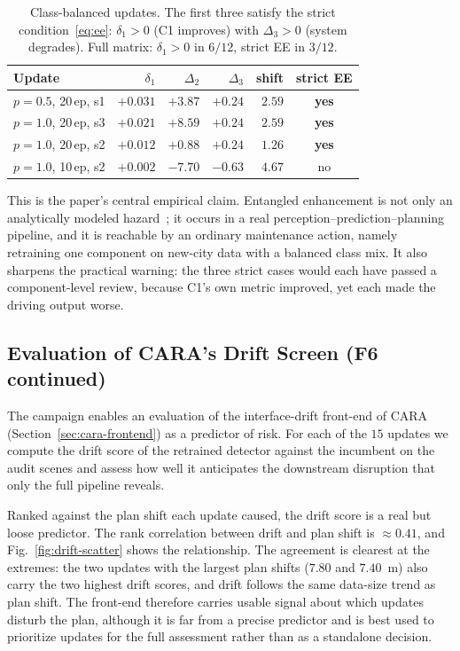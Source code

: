\documentclass[conference]{IEEEtran}
\begin{document}
\begin{table}[htbp]
\caption{Class-balanced updates. The first three satisfy the strict
condition~\eqref{eq:ee}: $\delta_1>0$ (C1 improves) with $\Delta_3>0$ (system
degrades). Full matrix: $\delta_1>0$ in $6/12$, strict EE in $3/12$.}
\label{tab:balanced}
\centering
\renewcommand{\arraystretch}{1.15}
\setlength{\tabcolsep}{4pt}
\footnotesize
\begin{tabular}{@{}lrrrrc@{}}
\toprule
\textbf{Update} & \textbf{$\delta_1$} & \textbf{$\Delta_2$} & \textbf{$\Delta_3$} & \textbf{shift} & \textbf{strict EE} \\
\midrule
$p{=}0.5$, 20\,ep, s1 & $+0.031$ & $+3.87$ & $+0.24$ & $2.59$ & \textbf{yes} \\
$p{=}1.0$, 20\,ep, s3 & $+0.021$ & $+8.59$ & $+0.24$ & $2.59$ & \textbf{yes} \\
$p{=}1.0$, 20\,ep, s2 & $+0.012$ & $+0.88$ & $+0.24$ & $1.26$ & \textbf{yes} \\
\midrule
$p{=}1.0$, 10\,ep, s2 & $+0.002$ & $-7.70$ & $-0.63$ & $4.67$ & no \\
\bottomrule
\end{tabular}
\end{table}

This is the paper's central empirical claim. Entangled enhancement is not only an
analytically modeled hazard~\cite{wang2024compsac}; it occurs in a real
perception--prediction--planning pipeline, and it is reachable by an ordinary
maintenance action, namely retraining one component on new-city data with a
balanced class mix. It also sharpens the practical warning: the three strict
cases would each have passed a component-level review, because C1's own metric
improved, yet each made the driving output worse.

\subsection{Evaluation of CARA's Drift Screen (F6 continued)}
\label{sec:res-gate}
The campaign enables an evaluation of the interface-drift front-end of CARA
(Section~\ref{sec:cara-frontend}) as a predictor of risk. For each of the $15$
updates we compute the drift score of the retrained detector against the
incumbent on the audit scenes and assess how well it anticipates the downstream
disruption that only the full pipeline reveals.

Ranked against the plan shift each update caused, the drift score is a real but
loose predictor. The rank correlation between drift and plan shift is
$\approx 0.41$, and Fig.~\ref{fig:drift-scatter} shows the relationship. The
agreement is clearest at the extremes: the two updates with the largest plan
shifts ($7.80$ and $7.40$~m) also carry the two highest drift scores, and drift
follows the same data-size trend as plan shift. The front-end therefore carries
usable signal about which updates disturb the plan, although it is far from a
precise predictor and is best used to prioritize updates for the full assessment
rather than as a standalone decision.
\end{document}
